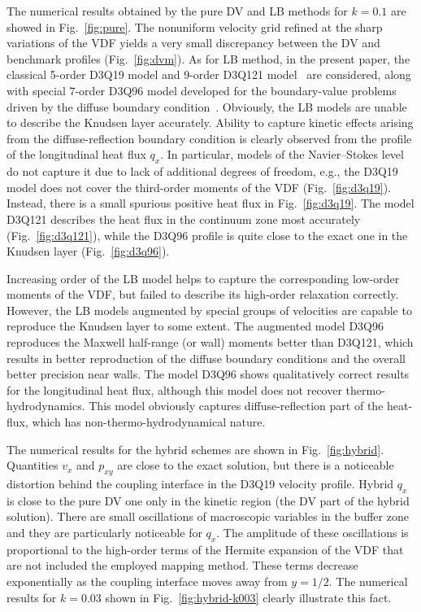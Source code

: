 \documentclass{elsarticle} %
\newcommand{\OO}[1]{O(#1)}
\begin{document}
The numerical results obtained by the pure DV and LB methods for \(k=0.1\) are showed in Fig.~\ref{fig:pure}.
The nonuniform velocity grid refined at the sharp variations of the VDF yields a very small discrepancy
between the DV and benchmark profiles (Fig.~\ref{fig:dvm}).
As for LB method, in the present paper, the classical 5-order D3Q19 model and 9-order D3Q121 model~\cite{Shan2010} are considered,
along with special 7-order D3Q96 model developed for the boundary-value problems driven by the diffuse boundary condition~\cite{Feuchter2016}.
Obviously, the LB models are unable to describe the Knudsen layer accurately.
Ability to capture kinetic effects arising from the diffuse-reflection boundary condition
is clearly observed from the profile of the longitudinal heat flux \(q_x\).
In particular, models of the Navier--Stokes level do not capture it due to lack of additional degrees of freedom,
e.g., the D3Q19 model does not cover the third-order moments of the VDF (Fig.~\ref{fig:d3q19}).
Instead, there is a small spurious positive heat flux in Fig.~\ref{fig:d3q19}.
The model D3Q121 describes the heat flux in the continuum zone most accurately (Fig.~\ref{fig:d3q121}),
while the D3Q96 profile is quite close to the exact one in the Knudsen layer (Fig.~\ref{fig:d3q96}).

Increasing order of the LB model helps to capture the corresponding low-order moments of the VDF,
but failed to describe its high-order relaxation correctly.
However, the LB models augmented by special groups of velocities are capable to reproduce the Knudsen layer to some extent.
The augmented model D3Q96 reproduces the Maxwell half-range (or wall) moments better than D3Q121,
which results in better reproduction of the diffuse boundary conditions and the overall better precision near walls.
The model D3Q96 shows qualitatively correct results for the longitudinal heat flux,
although this model does not recover thermo-hydrodynamics.
This model obviously captures diffuse-reflection part of the heat-flux,
which has non-thermo-hydrodynamical nature.

The numerical results for the hybrid schemes are shown in Fig.~\ref{fig:hybrid}.
Quantities \(v_x\) and \(p_{xy}\) are close to the exact solution,
but there is a noticeable distortion behind the coupling interface in the D3Q19 velocity profile.
Hybrid \(q_x\) is close to the pure DV one only in the kinetic region (the DV part of the hybrid solution).
There are small oscillations of macroscopic variables in the buffer zone and they are particularly noticeable for \(q_x\).
The amplitude of these oscillations is proportional to the high-order terms of the Hermite expansion of the VDF
that are not included the employed mapping method.
These terms decrease exponentially as the coupling interface moves away from \(y=1/2\).
The numerical results for \(k=0.03\) shown in Fig.~\ref{fig:hybrid-k003} clearly illustrate this fact.
\end{document}
